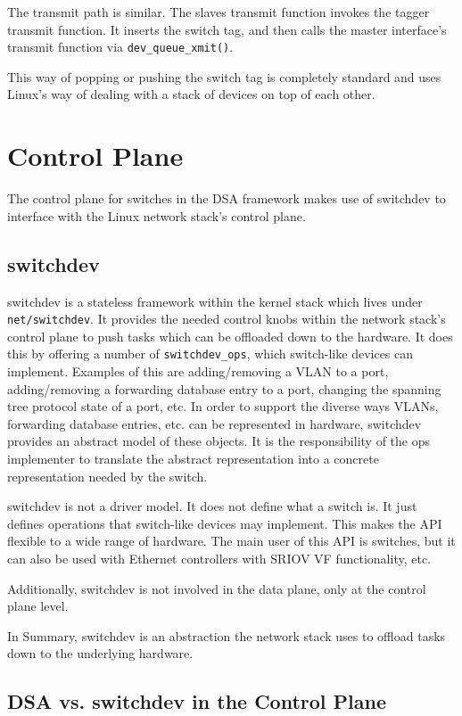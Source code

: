 \documentclass[letterpaper]{article}
\begin{document}
The transmit path is similar. The slaves transmit function invokes the
tagger transmit function. It inserts the switch tag, and then calls
the master interface's transmit function via \verb|dev_queue_xmit()|.

This way of popping or pushing the switch tag is completely standard
and uses Linux's way of dealing with a stack of devices on top of each
other.

\section{Control Plane}

The control plane for switches in the DSA framework makes use of
switchdev to interface with the Linux network stack's control plane.

\subsection{switchdev}

switchdev is a stateless framework within the kernel stack which lives
under \verb|net/switchdev|. It provides the needed control knobs
within the network stack's control plane to push tasks which can be
offloaded down to the hardware. It does this by offering a number of
\verb|switchdev_ops|, which switch-like devices can
implement. Examples of this are adding/removing a VLAN to a port,
adding/removing a forwarding database entry to a port, changing the spanning
tree protocol state of a port, etc. In order to support the diverse
ways VLANs, forwarding database entries, etc. can be represented in
hardware, switchdev provides an abstract model of these objects. It is
the responsibility of the ops implementer to translate the abstract
representation into a concrete representation needed by the switch.

switchdev is not a driver model. It does not define what a switch
is. It just defines operations that switch-like devices may
implement. This makes the API flexible to a wide range of
hardware. The main user of this API is switches, but it can also be
used with Ethernet controllers with SRIOV VF functionality, etc.

Additionally, switchdev is not involved in the data plane, only at the
control plane level.

In Summary, switchdev is an abstraction the network stack uses to
offload tasks down to the underlying hardware.

\subsection{DSA vs. switchdev in the Control Plane}
\end{document}
